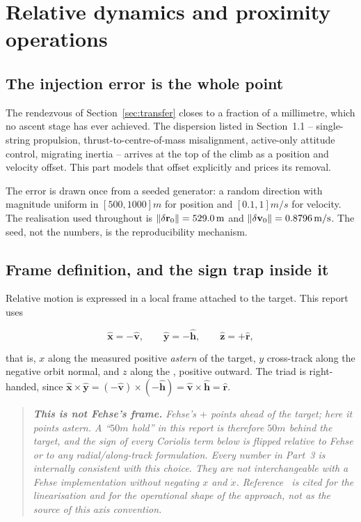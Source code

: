 \section{Relative dynamics and proximity operations}
\label{sec:proximity}

\subsection{The injection error is the whole point}

The rendezvous of Section~\ref{sec:transfer} closes to a fraction of a
millimetre, which no ascent stage has ever achieved. The dispersion listed in
Section~1.1 -- single-string propulsion, thrust-to-centre-of-mass misalignment,
active-only attitude control, migrating inertia -- arrives at the top of the
climb as a position and velocity offset. This part models that offset explicitly
and prices its removal.

The error is drawn once from a seeded generator: a random direction with
magnitude uniform in $[500, 1000]\unit{m}$ for position and $[0.1, 1]\unit{m/s}$
for velocity. The realisation used throughout is
$\lVert\delta\mathbf r_0\rVert = 529.0\,\mathrm{m}$ and
$\lVert\delta\mathbf v_0\rVert = 0.8796\,\mathrm{m/s}$. The seed, not the numbers,
is the reproducibility mechanism.

\subsection{Frame definition, and the sign trap inside it}
\label{sec:proximity:frame}

Relative motion is expressed in a local frame attached to the target. This
report uses

\begin{equation}
\hat{\mathbf x} = -\hat{\mathbf v}, \qquad
\hat{\mathbf y} = -\hat{\mathbf h}, \qquad
\hat{\mathbf z} = +\hat{\mathbf r},
\label{eq:lvlh}
\end{equation}

that is, $x$ along the \vbar{} measured positive \emph{astern} of the target,
$y$ cross-track along the negative orbit normal, and $z$ along the \rbar{},
positive outward. The triad is right-handed, since
$\hat{\mathbf x}\times\hat{\mathbf y} = (-\hat{\mathbf v})\times(-\hat{\mathbf h})
= \hat{\mathbf v}\times\hat{\mathbf h} = \hat{\mathbf r}$.

\begin{quote}\small\itshape
\textbf{This is not Fehse's frame.} Fehse's $+$\vbar{} points ahead of the
target; here it points astern. A ``$50\unit{m}$ \vbar{} hold'' in this report is
therefore $50\unit{m}$ \emph{behind} the target, and the sign of every Coriolis
term below is flipped relative to Fehse or to any radial/along-track
formulation. Every number in Part~3 is internally consistent with this choice.
They are not interchangeable with a Fehse implementation without negating $x$
and $\dot x$. Reference~\cite{fehse} is cited for the linearisation and for the
operational shape of the approach, not as the source of this axis convention.
\end{quote}

